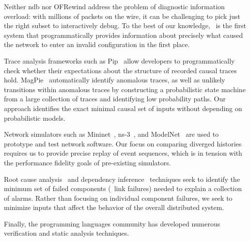 Neither ndb nor OFRewind address the problem of diagnostic information
overload: with millions of packets on the wire, it can
be challenging to pick just the right subset to interactively debug.
To the
best of our knowledge, \simulator~is the first system that programmatically provides
information about precisely what caused the network to enter an invalid
configuration in the first place.


Trace analysis frameworks such as Pip~\cite{pip} allow developers
to programmatically check whether their expectations about the structure of
recorded causal
traces hold. MagPie~\cite{barham2004using} automatically identify anomalous
traces, as well as unlikely transitions within anomalous traces by constructing
a probabilistic state machine from a large collection of traces and
identifying low probability paths.
Our approach identifies the exact minimal causal set of inputs without
depending on probabilistic models.

Network simulators such as
Mininet~\cite{handigol2012reproducible}, ns-3~\cite{ns3}, and ModelNet~\cite{Vahdat:2002:SAL:844128.844154}
are used to prototype and test network software.
Our focus on comparing diverged histories requires us
to provide precise replay of event sequences, which is in tension with the performance
fidelity goals of pre-existing simulators.

Root cause analysis~\cite{yemini1996} and dependency inference~\cite{Kandula:2009:DDE:1592568.1592597}
techniques seek to identify the minimum set of failed
components (\eg~link failures) needed to explain a collection of alarms. Rather than
focusing on individual component failures, we seek to minimize inputs that affect the behavior
of the overall distributed system.


Finally, the programming languages community has developed
numerous verification and static analysis techniques.

